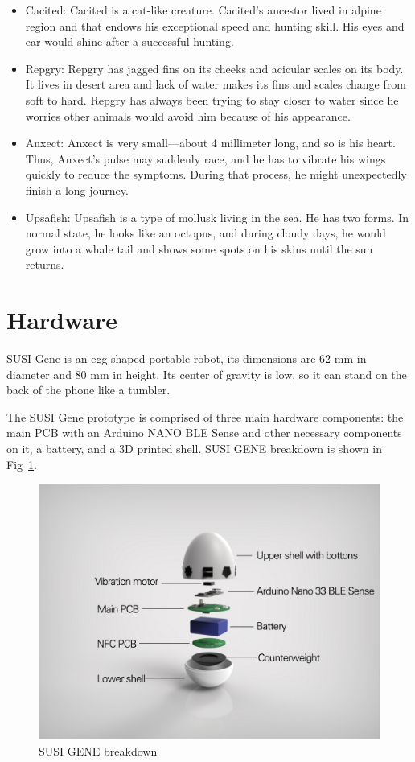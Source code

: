 \documentclass[manuscript,screen]{acmart}
\begin{document}
\begin{itemize}
  \item Cacited: Cacited is a cat-like creature. Cacited’s ancestor lived in alpine region and that endows his exceptional speed and hunting skill. His eyes and ear would shine after a successful hunting.
  \item Repgry: Repgry has jagged fins on its cheeks and acicular scales on its body. It lives in desert area and lack of water makes its fins and scales change from soft to hard. Repgry has always been trying to stay closer to water since he worries other animals would avoid him because of his appearance.
  \item Anxect: Anxect is very small—about 4 millimeter long, and so is his heart. Thus, Anxect’s pulse may suddenly race, and he has to vibrate his wings quickly to reduce the symptoms. During that process, he might unexpectedly finish a long journey. 
  \item Upsafish: Upsafish is a type of mollusk living in the sea. He has two forms. In normal state, he looks like an octopus, and during cloudy days, he would grow into a whale tail  and shows some spots on his skins until the sun returns.
\end{itemize}


\section{Hardware}

SUSI Gene is an egg-shaped portable robot, its dimensions are 62 mm in diameter and 80 mm in height. Its center of gravity is low, so it can stand on the back of the phone like a tumbler.

The SUSI Gene prototype is comprised of three main hardware components: the main PCB with an Arduino NANO BLE Sense and other necessary components on it, a battery, and a 3D printed shell. SUSI GENE breakdown is shown in Fig~\ref{Breakdown}.

\begin{figure}[h]
  \centering
  \includegraphics[width=\linewidth]{Breakdown.jpg}
  \caption{SUSI GENE breakdown}
  \label{Breakdown}
\end{figure}
\end{document}

